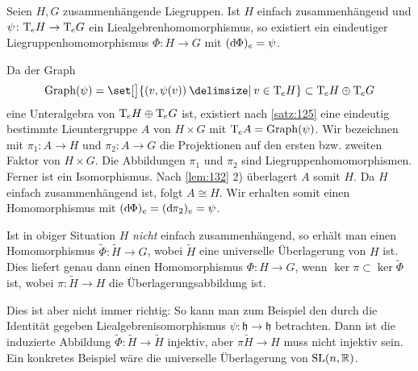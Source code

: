 \begin{lemma}[label=lem:134,{name=[{Liegruppenhomomorphismus aus Liealgebrenhomomorphismus wenn einfach zusammenhängend}]}]
	Seien $H,G$ zusammenhängende Liegruppen.
	Ist $H$ einfach zusammenhängend und $\psi \colon \mathrm{T}\mkern-0.85mu_e H \to \mathrm{T}\mkern-0.85mu_e G$ ein Liealgebrenhomomorphismus, so existiert ein eindeutiger Liegruppenhomomorphismus $\Phi \colon H \to G$ mit $(\mathrm{d}\mkern-1.0mu \Phi)_e = \psi$.
\end{lemma}
\begin{beweis}
	Da der Graph
	\[
		\Graph(\psi) = \set[\big]{\enbrace*{v,\psi(v)} \given v \in \Tmap_e H} \subset \Tmap_e H \oplus \Tmap_e G
	\]
	eine Unteralgebra von $\mathrm{T}\mkern-0.85mu_e H \oplus \mathrm{T}\mkern-0.85mu_e G$ ist, existiert nach \autoref{satz:125} eine eindeutig bestimmte Lieuntergruppe $A$ von $H \times G$ mit $\mathrm{T}\mkern-0.85mu_e A = \operatorname{Graph}(\psi)$.
	Wir bezeichnen mit $\pi_1 \colon A \to H$ und $\pi_2 \colon A \to G$ die Projektionen auf den ersten bzw. zweiten Faktor von $H \times G$.
	Die Abbildungen $\pi_1$ und $\pi_2$ sind Liegruppenhomomorphismen.
	Ferner ist 
	ein Isomorphismus.
	Nach \autoref{lem:132} 2) überlagert $A$ somit $H$.
	Da $H$ einfach zusammenhängend ist, folgt $A \cong H$.
	Wir erhalten somit einen Homomorphismus 
	mit $(\mathrm{d}\mkern-1.0mu \Phi)_e = (\mathrm{d}\mkern-1.0mu \pi_2)_e = \psi$.
\end{beweis}

Ist in obiger Situation $H$ \emph{nicht} einfach zusammenhängend, so erhält man einen Homomorphismus $\tilde{\Phi} \colon \tilde{H} \to G$, wobei $\tilde{H}$ eine universelle Überlagerung von $H$ ist.
Dies liefert genau dann einen Homomorphismus $\Phi \colon H \to G$, wenn $\ker \pi \subset \ker \tilde{\Phi}$ ist, wobei $\pi \colon \tilde{H} \to H$ die Überlagerungsabbildung ist.

Dies ist aber nicht immer richtig:
So kann man zum Beispiel den durch die Identität gegeben Liealgebrenisomorphismus $\psi \colon \mathfrak{h} \to \mathfrak{h}$ betrachten.
Dann ist die induzierte Abbildung $\tilde{\Phi} \colon \tilde{H} \to \tilde{H}$ injektiv, aber $\pi \tilde{H} \to H$ muss nicht injektiv sein.
Ein konkretes Beispiel wäre die universelle Überlagerung von $\operatorname{SL}(n,\mathbb{R})$.

